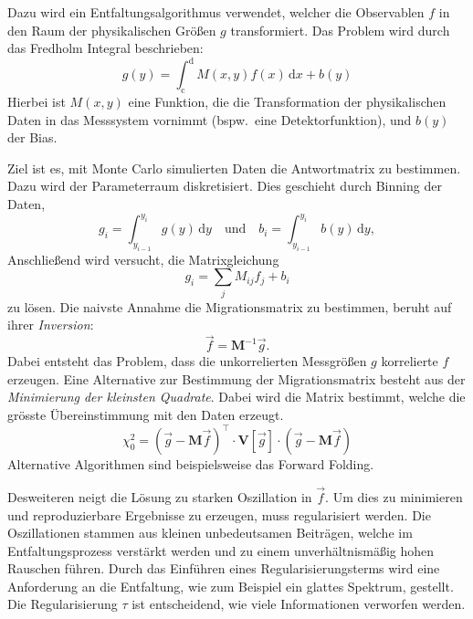 Dazu wird ein
Entfaltungsalgorithmus verwendet,
welcher die Observablen $f$
in den Raum der physikalischen Größen $g$ transformiert.
Das Problem wird durch das Fredholm Integral beschrieben:
\begin{equation}
	g(y) = \int_\text{c}^\text{d} M(x,y) f(x) \, \text{d}x + b(y)
\end{equation}
Hierbei ist $M(x, y)$ eine Funktion, die die Transformation der physikalischen
Daten in das Messsystem vornimmt (bspw.\ eine Detektorfunktion), und $b(y)$ der Bias.

Ziel ist es, mit Monte Carlo simulierten Daten
die Antwortmatrix zu bestimmen.
Dazu wird der Parameterraum diskretisiert.
Dies geschieht durch Binning der Daten,
\begin{equation}
	g_i = \int_{y_{i-1}}^{y_i} g(y) \, \text{d}y \quad \text{und} \quad
	b_i = \int_{y_{i-1}}^{y_i} b(y) \, \text{d}y,
\end{equation}
Anschließend wird versucht, die Matrixgleichung
\begin{equation}
	g_i = \sum_j M_{ij} f_j + b_i
\end{equation}
zu lösen.
Die naivste Annahme die Migrationsmatrix zu bestimmen,
beruht auf ihrer \textit{Inversion}:
\begin{equation}
    \vec{f} = \mathbf{M}^{-1} \vec{g}.
\end{equation}
Dabei entsteht das Problem, dass die unkorrelierten Messgrößen $g$
korrelierte $f$ erzeugen.
Eine Alternative zur Bestimmung der Migrationsmatrix
besteht aus der \textit{Minimierung der kleinsten Quadrate}.
Dabei wird die Matrix bestimmt,
welche die grösste Übereinstimmung mit den Daten erzeugt.
\begin{equation}
    \chi^2_0 = {\left( \vec{g} - \mathbf{M} \vec{f} \right)}^\intercal
        \cdot \mathbf{V} \left[ \vec{g} \right] \cdot
        \left( \vec{g} - \mathbf{M} \vec{f} \right)
\end{equation}
Alternative Algorithmen sind beispielsweise das Forward Folding.

Desweiteren neigt die Lösung zu starken Oszillation in $\vec{f}$.
Um dies zu minimieren und reproduzierbare Ergebnisse zu erzeugen,
muss regularisiert werden.
Die Oszillationen stammen aus kleinen unbedeutsamen Beiträgen, welche im
Entfaltungsprozess verstärkt werden und zu einem unverhältnismäßig hohen
Rauschen führen.
Durch das Einführen eines Regularisierungsterms wird eine Anforderung an die
Entfaltung, wie zum Beispiel ein glattes Spektrum, gestellt.
Die Regularisierung $\tau$ ist entscheidend, wie viele
Informationen verworfen werden.

